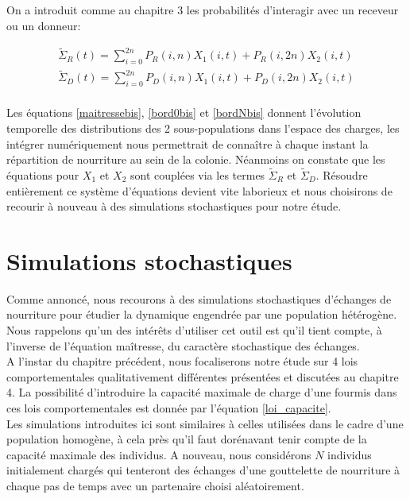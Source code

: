 On a introduit comme au chapitre 3 les probabilités d'interagir avec un receveur ou un donneur:

\begin{equation}
\begin{aligned}
\tilde{\Sigma}_R(t) = \sum_{i=0}^{2n} P_R(i,n) X_1(i,t)+ P_R(i,2n) X_2(i,t)\\
\tilde{\Sigma}_D(t) = \sum_{i=0}^{2n} P_D(i,n) X_1(i,t)+ P_D(i,2n) X_2(i,t)\\			
\end{aligned}
\end{equation}

Les équations \ref{maitressebis}, \ref{bord0bis} et \ref{bordNbis} donnent l'évolution temporelle des distributions des 2 sous-populations dans l'espace des charges, les intégrer numériquement nous permettrait de connaître à chaque instant la répartition de nourriture au sein de la colonie. Néanmoins on constate que les équations pour $X_1$ et $X_2$ sont couplées via les termes $\tilde{\Sigma}_R$ et $\tilde{\Sigma}_D$. Résoudre entièrement ce système d'équations devient vite laborieux et nous choisirons de recourir à nouveau à des simulations stochastiques pour notre étude.

\section{Simulations stochastiques}

Comme annoncé, nous recourons à des simulations stochastiques d'échanges de nourriture pour étudier la dynamique engendrée par une population hétérogène. Nous rappelons qu'un des intérêts d'utiliser cet outil est qu'il tient compte, à l'inverse de l'équation maîtresse, du caractère stochastique des échanges. \\

A l'instar du chapitre précédent, nous focaliserons notre étude sur 4 lois comportementales qualitativement différentes présentées et discutées au chapitre 4. La possibilité d'introduire la capacité maximale de charge d'une fourmis dans ces lois comportementales est donnée par l'équation \ref{loi_capacite}. \\ 

Les simulations introduites ici sont similaires à celles utilisées dans le cadre d'une population homogène, à cela près qu'il faut dorénavant tenir compte de la capacité maximale des individus. A nouveau, nous considérons $N$ individus initialement chargés qui tenteront des échanges d'une gouttelette de nourriture à chaque pas de temps avec un partenaire choisi aléatoirement.\\

